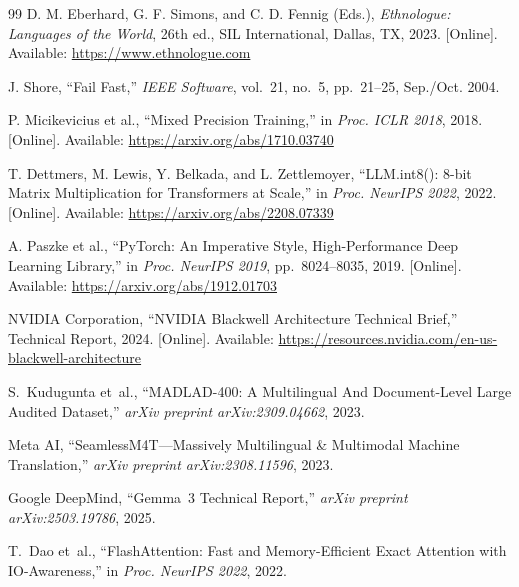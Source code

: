 \documentclass[conference]{IEEEtran}
\begin{document}
\begin{thebibliography}{99}
D. M. Eberhard, G. F. Simons, and C. D. Fennig (Eds.),
\textit{Ethnologue: Languages of the World}, 26th ed.,
SIL International, Dallas, TX, 2023.
[Online]. Available: \url{https://www.ethnologue.com}

J. Shore, ``Fail Fast,''
\textit{IEEE Software}, vol.~21, no.~5, pp.~21--25, Sep./Oct. 2004.

P. Micikevicius et al., ``Mixed Precision Training,''
in \textit{Proc. ICLR 2018}, 2018.
[Online]. Available: \url{https://arxiv.org/abs/1710.03740}

T. Dettmers, M. Lewis, Y. Belkada, and L. Zettlemoyer,
``LLM.int8(): 8-bit Matrix Multiplication for Transformers at Scale,''
in \textit{Proc. NeurIPS 2022}, 2022.
[Online]. Available: \url{https://arxiv.org/abs/2208.07339}

A. Paszke et al., ``PyTorch: An Imperative Style, High-Performance Deep Learning Library,''
in \textit{Proc. NeurIPS 2019}, pp.~8024--8035, 2019.
[Online]. Available: \url{https://arxiv.org/abs/1912.01703}

NVIDIA Corporation, ``NVIDIA Blackwell Architecture Technical Brief,''
Technical Report, 2024.
[Online]. Available: \url{https://resources.nvidia.com/en-us-blackwell-architecture}

S.~Kudugunta et~al.,
``MADLAD-400: A Multilingual And Document-Level Large Audited Dataset,''
\textit{arXiv preprint arXiv:2309.04662}, 2023.

Meta AI,
``SeamlessM4T---Massively Multilingual \& Multimodal Machine Translation,''
\textit{arXiv preprint arXiv:2308.11596}, 2023.

Google DeepMind,
``Gemma~3 Technical Report,''
\textit{arXiv preprint arXiv:2503.19786}, 2025.

T.~Dao et~al.,
``FlashAttention: Fast and Memory-Efficient Exact Attention with IO-Awareness,''
in \textit{Proc. NeurIPS 2022}, 2022.

\end{thebibliography}
\end{document}
